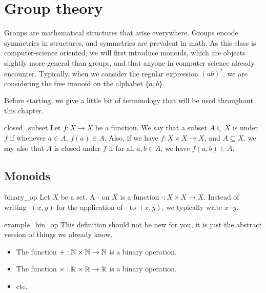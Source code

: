 \section{Group theory}

Groups are mathematical structures that arise everywhere. Groups encode symmetries in structures, and symmetries are prevalent in math. As this class is computer-science oriented, we will first introduce monoids, which are objects slightly more general than groups, and that anyone in computer science already encounter. Typically, when we consider the regular expression \( (ab)^* \), we are considering the free monoid on the alphabet \( \{ a, b \} \). 

Before starting, we give a little bit of terminology that will be used throughout this chapter.
\begin{cdef}{}{closed_subset}
    Let \( f : X \to X \) be a function. We say that a subset \( A \subseteq X \) is  under \( f \) if whenever \( a \in A \), \( f(a) \in A \). Also, if we have \( f : X\times X \to X \), and \( A \subseteq X \), we say also that \( A \) is closed under \( f \) if for all \( a, b \in  A \), we have \( f(a, b) \in A \). 
\end{cdef}

\subsection{Monoids}

\begin{cdef}{}{binary_op}
    Let \( X \) be a set. A  \( \cdot \) on \( X \) is a function \( \cdot : X \times X \to X \). Instead of writing \( \cdot(x, y) \) for the application of \( \cdot \) to \( (x, y) \), we typically write \( x \cdot y \).
\end{cdef}

\begin{cexp}{}{example_bin_op}
    This definition should not be new for you, it is just the abstract version of things we already know. 
    \begin{itemize}
        \item The function \( + : \mathbb{N} \times \mathbb{N} \to \mathbb{N} \) is a binary operation.
        \item The function \( \times : \mathbb{R} \times \mathbb{R} \to \mathbb{R} \) is a binary operation.
        \item etc.
    \end{itemize}
\end{cexp}

